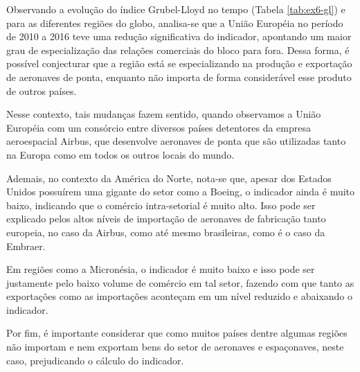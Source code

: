 

Observando a evolução do índice Grubel-Lloyd no tempo (Tabela \ref{tab:ex6-gl}) e para as diferentes regiões do globo, analisa-se que a União Européia no período de 2010 a 2016 teve uma redução significativa do indicador, apontando um maior grau de especialização das relações comerciais do bloco para fora. Dessa forma, é possível conjecturar que a região está se especializando na produção e exportação de aeronaves de ponta, enquanto não importa de forma considerável esse produto de outros países. 

Nesse contexto, tais mudanças fazem sentido, quando observamos a União Européia com um consórcio entre diversos países detentores da empresa aeroespacial Airbus, que desenvolve aeronaves de ponta que são utilizadas tanto na Europa como em todos os outros locais do mundo.

Ademais, no contexto da América do Norte, nota-se que, apesar dos Estados Unidos possuírem uma gigante do setor como a Boeing, o indicador ainda é muito baixo, indicando que o comércio intra-setorial é muito alto. Isso pode ser explicado pelos altos níveis de importação de aeronaves de fabricação tanto europeia, no caso da Airbus, como até mesmo brasileiras, como é o caso da Embraer.

Em regiões como a Micronésia, o indicador é muito baixo e isso pode ser justamente pelo baixo volume de comércio em tal setor, fazendo com que tanto as exportações como as importações aconteçam em um nível reduzido e abaixando o indicador.  

Por fim, é importante considerar que como muitos países dentre algumas regiões não importam e nem exportam bens do setor de aeronaves e espaçonaves, neste caso, prejudicando o cálculo do indicador. 


\clearpage
